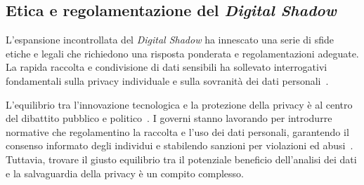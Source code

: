 \subsection{Etica e regolamentazione del \emph{Digital Shadow}}

L'espansione incontrollata del \emph{Digital Shadow} ha innescato una serie di sfide etiche e legali che richiedono una risposta ponderata e regolamentazioni adeguate. La rapida raccolta e condivisione di dati sensibili ha sollevato interrogativi fondamentali sulla privacy individuale e sulla sovranità dei dati personali~\cite{Shadow_economy, Sell_data, Sell_data2}.

L'equilibrio tra l'innovazione tecnologica e la protezione della privacy è al centro del dibattito pubblico e politico~\cite{Sell_data2, Sell_data}. I governi stanno lavorando per introdurre normative che regolamentino la raccolta e l'uso dei dati personali, garantendo il consenso informato degli individui e stabilendo sanzioni per violazioni ed abusi~\cite{Law_Data}. Tuttavia, trovare il giusto equilibrio tra il potenziale beneficio dell'analisi dei dati e la salvaguardia della privacy è un compito complesso.